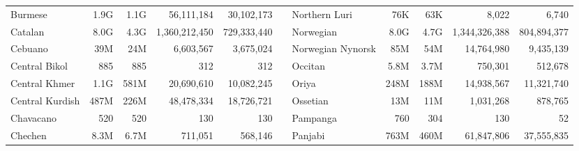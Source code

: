 \begin{table*}[t!]
\begin{tabular}{lrrrrclrrrr}
        Burmese                   & 1.9G                     & 1.1G                      & 56,111,184               & 30,102,173                &                          & Northern Luri             & 76K                      & 63K                       & 8,022                    & 6,740                     \\
        Catalan                   & 8.0G                     & 4.3G                      & 1,360,212,450            & 729,333,440               &                          & Norwegian                 & 8.0G                     & 4.7G                      & 1,344,326,388            & 804,894,377               \\
        Cebuano                   & 39M                      & 24M                       & 6,603,567                & 3,675,024                 &                          & Norwegian Nynorsk         & 85M                      & 54M                       & 14,764,980               & 9,435,139                 \\
        Central Bikol             & 885                      & 885                       & 312                      & 312                       &                          & Occitan                   & 5.8M                     & 3.7M                      & 750,301                  & 512,678                   \\
        Central Khmer             & 1.1G                     & 581M                      & 20,690,610               & 10,082,245                &                          & Oriya                     & 248M                     & 188M                      & 14,938,567               & 11,321,740                \\
        Central Kurdish           & 487M                     & 226M                      & 48,478,334               & 18,726,721                &                          & Ossetian                  & 13M                      & 11M                       & 1,031,268                & 878,765                   \\
        Chavacano                 & 520                      & 520                       & 130                      & 130                       &                          & Pampanga                  & 760                      & 304                       & 130                      & 52                        \\
        Chechen                   & 8.3M                     & 6.7M                      & 711,051                  & 568,146                   &                          & Panjabi                   & 763M                     & 460M                      & 61,847,806               & 37,555,835                \\

\end{tabular}
\end{table*}
